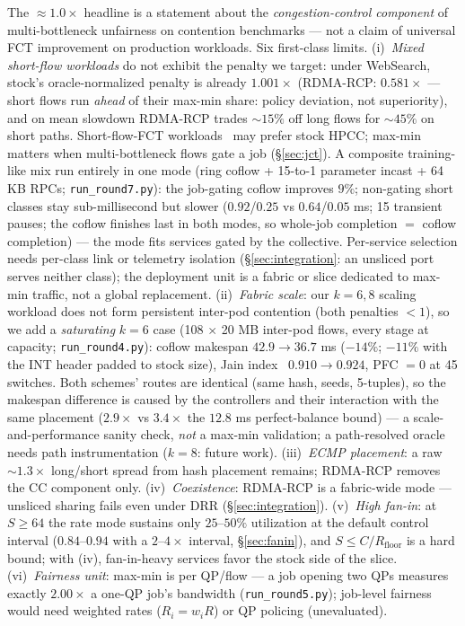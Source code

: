 \documentclass[sigconf, nonacm]{acmart}
\newcommand{\hpccfs}{\textsc{RDMA-RCP}\xspace}
\begin{document}
The ${\approx}1.0\times$ headline is a statement about the \emph{congestion-control component}
of multi-bottleneck unfairness on contention benchmarks --- not a claim of universal FCT
improvement on production workloads. Six first-class limits. (i)~\emph{Mixed short-flow
workloads} do not exhibit the penalty we target: under WebSearch, stock's oracle-normalized
penalty is already $1.001\times$ (\hpccfs: $0.581\times$ --- short flows run \emph{ahead} of their
max-min share: policy deviation, not superiority), and on mean slowdown \hpccfs trades ${\sim}15\%$ off long flows for ${\sim}45\%$ on
short paths. Short-flow-FCT workloads~\cite{montazeri2018homa,alizadeh2013pfabric} may
prefer stock HPCC; max-min matters when multi-bottleneck flows gate a job (\S\ref{sec:jct}).
A composite training-like mix run entirely in one mode (ring coflow + 15-to-1 parameter
incast + 64 KB RPCs; \texttt{run\_round7.py}): the job-gating coflow improves $9\%$;
non-gating short classes stay sub-millisecond but slower ($0.92$/$0.25$ vs $0.64$/$0.05$ ms;
15 transient pauses; the coflow finishes last in both modes, so whole-job completion $=$
coflow completion) --- the mode fits services gated by the collective.
Per-service selection needs per-class link or telemetry isolation (\S\ref{sec:integration}:
an unsliced port serves neither class); the deployment unit is a fabric or slice dedicated to
max-min traffic, not a global replacement.
(ii)~\emph{Fabric scale}: our $k = 6, 8$ scaling workload does not form persistent
inter-pod contention (both penalties ${<}1$), so we add a \emph{saturating} $k{=}6$ case (108
$\times$ 20 MB inter-pod flows, every stage at capacity; \texttt{run\_round4.py}): coflow
makespan $42.9 \to 36.7$ ms ($-14\%$; $-11\%$ with
the INT header padded to stock size), Jain index~\cite{jain1984fairness} $0.910 \to 0.924$,
PFC $= 0$ at 45 switches. Both
schemes' routes are identical (same hash, seeds, 5-tuples), so the makespan difference is
caused by the controllers and their interaction with the same placement ($2.9\times$ vs
$3.4\times$ the $12.8$ ms perfect-balance bound) --- a scale-and-performance sanity check,
\emph{not} a max-min validation; a path-resolved oracle needs path instrumentation ($k{=}8$: future work). (iii)~\emph{ECMP placement}: a raw ${\sim}1.3\times$ long/short spread from hash placement
remains; \hpccfs removes the CC component only. (iv)~\emph{Coexistence}: \hpccfs is a fabric-wide mode --- unsliced sharing fails even
under DRR (\S\ref{sec:integration}). (v)~\emph{High fan-in}: at $S \ge 64$ the rate mode sustains only $25$--$50\%$
utilization at the default control interval ($0.84$--$0.94$ with a $2$--$4\times$ interval,
\S\ref{sec:fanin}), and $S \le C/R_{\mathrm{floor}}$ is a hard bound; with (iv), fan-in-heavy
services favor the stock side of the slice.
(vi)~\emph{Fairness unit}: max-min is per QP/flow --- a job opening two QPs measures
exactly $2.00\times$ a one-QP job's bandwidth (\texttt{run\_round5.py}); job-level
fairness would need weighted rates ($R_i = w_i R$) or QP policing (unevaluated).
\end{document}

